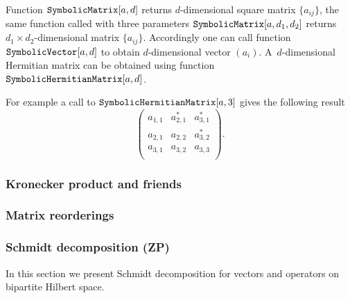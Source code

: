 \documentclass[11pt,a4paper]{article}
\newcommand{\1}{{\bf 1}}
\newcommand{\fname}[1]{\text{\texttt{#1}}}
\begin{document}
Function $\fname{SymbolicMatrix}[a,d]$ returns $d$-dimensional square matrix 
$\{a_{ij}\}$, the same function called with three parameters 
$\fname{SymbolicMatrix}[a,d_1,d_2]$ returns $d_1 \times d_2$-dimensional 
matrix $\{a_{ij}\}$. Accordingly one can call function 
$\fname{SymbolicVector}[a,d]$ to obtain $d$-dimensional vector $(a_i)$.
A~$d$-dimensional Hermitian matrix can be obtained using function 
$\fname{SymbolicHermitianMatrix}[a,d]$. 

For example a call to $\fname{SymbolicHermitianMatrix}[a,3]$ gives the 
following result
\begin{equation}
\left(
\begin{array}{ccc}
 a_{1,1} & a_{2,1}^* & a_{3,1}^* \\
 a_{2,1} & a_{2,2} & a_{3,2}^* \\
 a_{3,1} & a_{3,2} & a_{3,3} \\
\end{array}
\right).
\end{equation}


\subsubsection{Kronecker product and friends}

\subsubsection{Matrix reorderings}

\subsubsection{Schmidt decomposition (ZP)}
In this section we present Schmidt decomposition for vectors and operators on
bipartite Hilbert space.
\end{document}
